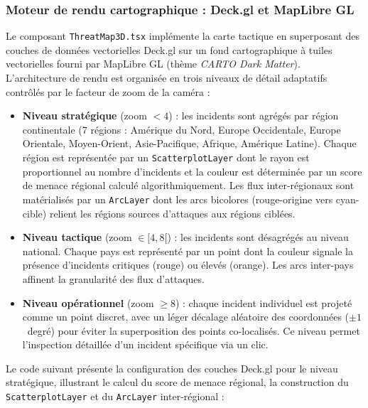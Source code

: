 \subsubsection{Moteur de rendu cartographique : Deck.gl et MapLibre GL}

Le composant \texttt{ThreatMap3D.tsx} implémente la carte tactique en superposant des couches de données vectorielles Deck.gl sur un fond cartographique à tuiles vectorielles fourni par MapLibre GL (thème \textit{CARTO Dark Matter}). L'architecture de rendu est organisée en trois niveaux de détail adaptatifs contrôlés par le facteur de zoom de la caméra :

\begin{itemize}
    \item \textbf{Niveau stratégique} (zoom $< 4$) : les incidents sont agrégés par région continentale (7 régions : Amérique du Nord, Europe Occidentale, Europe Orientale, Moyen-Orient, Asie-Pacifique, Afrique, Amérique Latine). Chaque région est représentée par un \texttt{ScatterplotLayer} dont le rayon est proportionnel au nombre d'incidents et la couleur est déterminée par un score de menace régional calculé algorithmiquement. Les flux inter-régionaux sont matérialisés par un \texttt{ArcLayer} dont les arcs bicolores (rouge-origine vers cyan-cible) relient les régions sources d'attaques aux régions ciblées.
    \item \textbf{Niveau tactique} (zoom $\in [4, 8[$) : les incidents sont désagrégés au niveau national. Chaque pays est représenté par un point dont la couleur signale la présence d'incidents critiques (rouge) ou élevés (orange). Les arcs inter-pays affinent la granularité des flux d'attaques.
    \item \textbf{Niveau opérationnel} (zoom $\geq 8$) : chaque incident individuel est projeté comme un point discret, avec un léger décalage aléatoire des coordonnées ($\pm 1$~degré) pour éviter la superposition des points co-localisés. Ce niveau permet l'inspection détaillée d'un incident spécifique via un clic.
\end{itemize}

Le code suivant présente la configuration des couches Deck.gl pour le niveau stratégique, illustrant le calcul du score de menace régional, la construction du \texttt{ScatterplotLayer} et du \texttt{ArcLayer} inter-régional :

